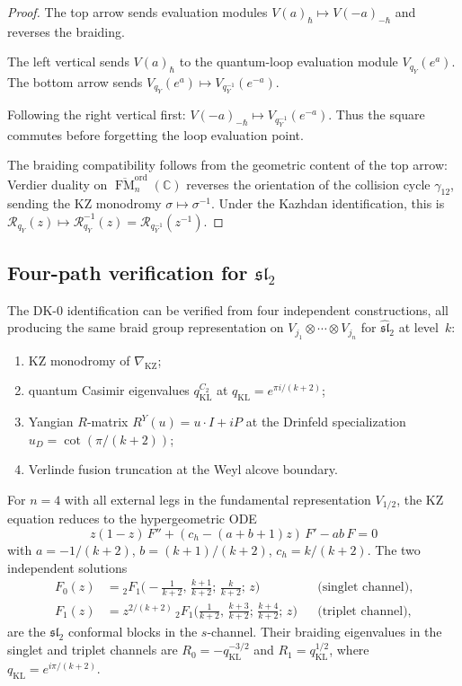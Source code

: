 \documentclass[11pt,reqno]{amsart}
\theoremstyle{definition}
\theoremstyle{remark}
\DeclareMathOperator{\FM}{FM}
\newcommand{\CC}{\mathbb{C}}
\newcommand{\cR}{\mathcal{R}}
\numberwithin{equation}{section}
\begin{document}
\begin{proof}
The top arrow sends evaluation modules
$V(a)_\hbar \mapsto V(-a)_{-\hbar}$ and reverses the
braiding.

The left vertical sends $V(a)_\hbar$ to the quantum-loop evaluation
module $V_{q_Y}(e^a)$.  The bottom arrow sends
$V_{q_Y}(e^a) \mapsto V_{q_Y^{-1}}(e^{-a})$.

Following the right vertical first:
$V(-a)_{-\hbar} \mapsto V_{q_Y^{-1}}(e^{-a})$.
Thus the square commutes before forgetting the loop evaluation point.

The braiding compatibility follows from the geometric
content of the top arrow: Verdier duality on
$\overline{\FM}_n^{\mathrm{ord}}(\CC)$ reverses the
orientation of the collision cycle $\gamma_{12}$,
sending the KZ monodromy $\sigma \mapsto \sigma^{-1}$.
Under the Kazhdan identification, this is
$\cR_{q_Y}(z) \mapsto \cR_{q_Y}^{-1}(z)
= \cR_{q_Y^{-1}}(z^{-1})$.
\end{proof}

\subsection{Four-path verification for $\mathfrak{sl}_2$}

The DK-0 identification can be verified from four
independent constructions, all producing the same braid
group representation on
$V_{j_1} \otimes \cdots \otimes V_{j_n}$ for
$\widehat{\mathfrak{sl}}_2$ at level~$k$:
\begin{enumerate}[label=(\arabic*)]
\item KZ monodromy of $\nabla_{\mathrm{KZ}}$;
\item quantum Casimir eigenvalues \(q_{\mathrm{KL}}^{C_2}\) at
  \(q_{\mathrm{KL}} = e^{\pi i/(k+2)}\);
\item Yangian $R$-matrix $R^Y(u) = u \cdot I + iP$
  at the Drinfeld specialization
  $u_D = \cot(\pi/(k+2))$;
\item Verlinde fusion truncation at the Weyl alcove
  boundary.
\end{enumerate}

For $n = 4$ with all external legs in the fundamental
representation $V_{1/2}$, the KZ equation reduces to the
hypergeometric ODE
\begin{equation}\label{eq:dk-hypergeometric}
z(1-z)\,F'' + (c_h - (a+b+1)z)\,F' - ab\,F = 0
\end{equation}
with $a = -1/(k+2)$, $b = (k+1)/(k+2)$,
$c_h = k/(k+2)$.  The two independent solutions
\begin{align}
F_0(z) &= {}_2F_1\bigl(
  -\tfrac{1}{k+2},\,\tfrac{k+1}{k+2};\,
  \tfrac{k}{k+2};\, z\bigr)
  & &\text{(singlet channel)},
  \label{eq:dk-singlet} \\
F_1(z) &= z^{2/(k+2)}\,{}_2F_1\bigl(
  \tfrac{1}{k+2},\,\tfrac{k+3}{k+2};\,
  \tfrac{k+4}{k+2};\, z\bigr)
  & &\text{(triplet channel)},
  \label{eq:dk-triplet}
\end{align}
are the $\mathfrak{sl}_2$ conformal blocks in the
$s$-channel.  Their braiding eigenvalues in the singlet
and triplet channels are
$R_0 = -q_{\mathrm{KL}}^{-3/2}$ and
$R_1 = q_{\mathrm{KL}}^{1/2}$, where
$q_{\mathrm{KL}} = e^{i\pi/(k+2)}$.
\end{document}
